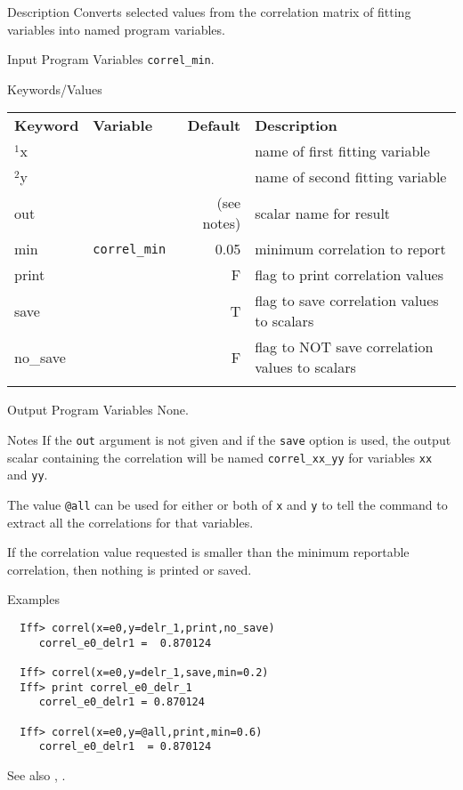 \begin{IFFcom}
\item[Description] Converts selected values from the correlation matrix of
  fitting variables into named program variables.
\item[Input Program Variables] {\tt{correl\_min}}.
\item[Keywords/Values] 
{\relax \hspace{0.25truein}\par\noindent\relax}
\begin{tabular}{llrl}
  \textbf{Keyword} & \textbf{Variable} & \textbf{Default} & \textbf{Description}\\
  \noalign{\smallskip}
  ${}^1${x} &  &    & name of first fitting variable \\
  ${}^2${y} &  &    & name of second fitting variable \\
  {out}     &  & (see notes)   & scalar name for result\\
  {min}     & {\tt{correl\_min}} & 0.05  & minimum correlation to report\\
  {print}   &  & F    & flag to print correlation values \\
  {save}     &  & T  & flag to save correlation values to scalars \\
  {no\_save} &  & F  & flag to NOT save correlation values to scalars \\
  \noalign{\smallskip}
\end{tabular}
\noindent
\item[Output Program Variables]  None.
\item[Notes] If the {\tt{out}} argument is not given and if the {\tt{save}}
  option is used, the output scalar containing the correlation will be named
  {\tt{correl\_xx\_yy}} for variables {\tt{xx}} and {\tt{yy}}.
  
  The value {\tt{@all}} can be used for either or both of {\tt{x}} and
  {\tt{y}} to tell the command to extract all the correlations for that
  variables.

  If the correlation value requested is smaller than the minimum reportable
  correlation, then nothing is printed or saved.
\item[Examples] {\hspace{1.in} \vspace{-0.1truein} \relax }
\begin{verbatim} 
  Iff> correl(x=e0,y=delr_1,print,no_save)
     correl_e0_delr1 =  0.870124

  Iff> correl(x=e0,y=delr_1,save,min=0.2)
  Iff> print correl_e0_delr_1
     correl_e0_delr1 = 0.870124

  Iff> correl(x=e0,y=@all,print,min=0.6)
     correl_e0_delr1  = 0.870124
\end{verbatim}
\item[See also] {}, {}.
\end{IFFcom}


